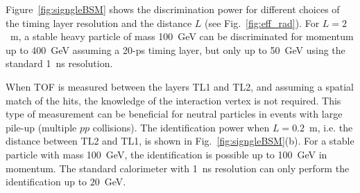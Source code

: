 Figure~\ref{fig:signgleBSM} shows the discrimination power for different choices of the timing layer resolution
and the distance $L$ (see Fig.~\ref{fig:eff_rad}).
For $L=2$~m, a stable heavy particle of mass 100~GeV can be discriminated for momentum up to 
400~GeV assuming a 20-ps timing layer,
but only up to 50~GeV using the standard 1~ns resolution.

When  TOF is measured between the layers TL1 and TL2, and assuming a spatial match of the hits, the knowledge of the interaction vertex is not required.
This type of measurement can be beneficial for neutral particles in events with large pile-up (multiple $pp$ collisions).
The identification power when $L=0.2$~m, i.e. the distance between TL2 and TL1, is shown in Fig.~\ref{fig:signgleBSM}(b).
For a stable particle with mass 100~GeV, the identification is possible up to 100~GeV in momentum. The standard calorimeter with
1~ns resolution can only perform the identification up to $20$~GeV. 
